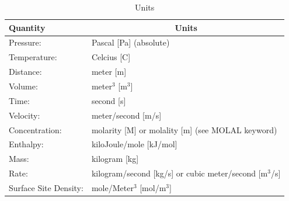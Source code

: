 \documentclass[12pt]{article}
\begin{document}
\begin{table}[h]\centering
\caption{Units}\label{tunits}

\vspace{3mm}

\begin{tabular}{ll}
\toprule[2pt]
Quantity & \multicolumn{1}{c}{Units}\\
\midrule[1pt]
Pressure: & Pascal [Pa] (absolute)\\
Temperature: & Celcius [C]\\
Distance: & meter [m]\\
Volume: & meter$^3$ [m$^3$]\\
Time: & second [s]\\
Velocity: & meter/second [m/s]\\
Concentration: & molarity [M] or molality [m] (see MOLAL keyword)\\
Enthalpy: & kiloJoule/mole [kJ/mol]\\
Mass: & kilogram [kg]\\
Rate: & kilogram/second [kg/s] or cubic meter/second [m$^3$/s]\\
Surface Site Density: & mole/Meter$^{3}$ [mol/m$^{3}$]\\
\bottomrule[1.5pt]
\end{tabular}
\end{table}

\end{document}
